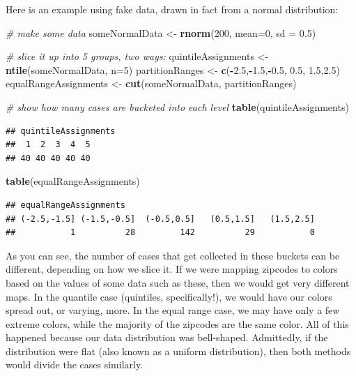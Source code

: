 \documentclass[openany]{book}
\newenvironment{Shaded}{\begin{snugshade}}{\end{snugshade}}
\newcommand{\CommentTok}[1]{\textcolor[rgb]{0.56,0.35,0.01}{\textit{#1}}}
\newcommand{\DataTypeTok}[1]{\textcolor[rgb]{0.13,0.29,0.53}{#1}}
\newcommand{\DecValTok}[1]{\textcolor[rgb]{0.00,0.00,0.81}{#1}}
\newcommand{\FloatTok}[1]{\textcolor[rgb]{0.00,0.00,0.81}{#1}}
\newcommand{\KeywordTok}[1]{\textcolor[rgb]{0.13,0.29,0.53}{\textbf{#1}}}
\newcommand{\NormalTok}[1]{#1}
\newcommand{\OperatorTok}[1]{\textcolor[rgb]{0.81,0.36,0.00}{\textbf{#1}}}
\newcommand{\StringTok}[1]{\textcolor[rgb]{0.31,0.60,0.02}{#1}}
\begin{document}
Here is an example using fake data, drawn in fact from a normal distribution:

\begin{Shaded}
\begin{Highlighting}[]
\CommentTok{# make some data}
\NormalTok{someNormalData <-}\StringTok{ }\KeywordTok{rnorm}\NormalTok{(}\DecValTok{200}\NormalTok{, }\DataTypeTok{mean=}\DecValTok{0}\NormalTok{, }\DataTypeTok{sd =} \FloatTok{0.5}\NormalTok{)}

\CommentTok{# slice it up into 5 groups, two ways:}
\NormalTok{quintileAssignments <-}\StringTok{ }\KeywordTok{ntile}\NormalTok{(someNormalData, }\DataTypeTok{n=}\DecValTok{5}\NormalTok{)}
\NormalTok{partitionRanges <-}\StringTok{ }\KeywordTok{c}\NormalTok{(}\OperatorTok{-}\FloatTok{2.5}\NormalTok{,}\OperatorTok{-}\FloatTok{1.5}\NormalTok{,}\OperatorTok{-}\FloatTok{0.5}\NormalTok{, }\FloatTok{0.5}\NormalTok{, }\FloatTok{1.5}\NormalTok{,}\FloatTok{2.5}\NormalTok{)}
\NormalTok{equalRangeAssignments <-}\StringTok{ }\KeywordTok{cut}\NormalTok{(someNormalData, partitionRanges)}

\CommentTok{# show how many cases are bucketed into each level}
\KeywordTok{table}\NormalTok{(quintileAssignments)}
\end{Highlighting}
\end{Shaded}

\begin{verbatim}
## quintileAssignments
##  1  2  3  4  5 
## 40 40 40 40 40
\end{verbatim}

\begin{Shaded}
\begin{Highlighting}[]
\KeywordTok{table}\NormalTok{(equalRangeAssignments)}
\end{Highlighting}
\end{Shaded}

\begin{verbatim}
## equalRangeAssignments
## (-2.5,-1.5] (-1.5,-0.5]  (-0.5,0.5]   (0.5,1.5]   (1.5,2.5] 
##           1          28         142          29           0
\end{verbatim}

As you can see, the number of cases that get collected in these buckets can be different, depending on how we slice it. If we were mapping zipcodes to colors based on the values of some data such as these, then we would get very different maps. In the quantile case (quintiles, specifically!), we would have our colors spread out, or varying, more. In the equal range case, we may have only a few extreme colors, while the majority of the zipcodes are the same color. All of this happened because our data distribution was bell-shaped. Admittedly, if the distribution were flat (also known as a uniform distribution), then both methods would divide the cases similarly.
\end{document}
